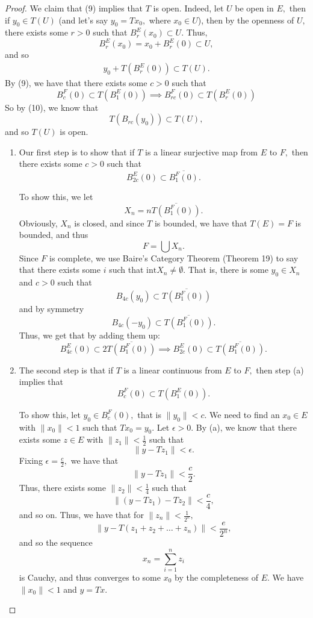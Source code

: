 \documentclass[10pt, oneside]{article}
\theoremstyle{definition}
\begin{document}
\begin{proof}
    We claim that (9) implies that $T$ is open. Indeed, let $U$ be open in $E,$ then if $y_0 \in T(U)$ (and let's say $y_0 = Tx_0,$ where $x_0 \in U$), then by the openness of $U,$ there exists some $r>0$ such that $B_r^E(x_0)\subset U.$ Thus, 
    \[B_r^E(x_0) = x_0 + B_r^E(0)\subset U,\] and so
    \begin{align}
    y_0 + T(B_r^E(0))\subset T(U).    
    \end{align}
    By (9), we have that there exists some $c>0$ such that 
    \[B_c^F(0)\subset T(B_1^E(0)) \implies B_{rc}^F(0)\subset T(B_r^E(0))\] So by (10), we know that
    \[T(B_{rc}(y_0))\subset T(U),\] and so $T(U)$ is open.

    \begin{enumerate}
        \item Our first step is to show that if $T$ is a linear surjective map from $E$ to $F,$ then there exists some $c>0$ such that 
        \[B_{2c}^E(0)\subset \overline{B^F_1(0)}.\]

        To show this, we let 
        \[X_n = n\overline{T(B^F_1(0))}.\] Obviously, $X_n$ is closed, and since $T$ is bounded, we have that $T(E) = F$ is bounded, and thus
        \[F = \bigcup X_n.\] Since $F$ is complete, we use Baire's Category Theorem (Theorem 19) to say that there exists some $i$ such that $\text{int}X_n \neq \emptyset.$ That is, there is some $y_0 \in X_n$ and $c>0$ such that 
        \[B_{4c}(y_0)\subset \overline{T(B^F_1(0))}\] and by symmetry
        \[B_{4c}(-y_0)\subset \overline{T(B_1^F(0))}.\]
        Thus, we get that by adding them up:
        \[B^E_{4c}(0) \subset 2\overline{T(B_1^F(0))} \implies B^E_{2c}(0) \subset \overline{T(B_1^F(0))}.\]

        \item The second step is that if $T$ is a linear continuous from $E$ to $F,$ then step (a) implies that 
        \[B_c^F(0)\subset T(B_1^E(0)).\]

        To show this, let $y_0 \in B_c^F(0),$ that is $\|y_0\|  < c.$ We need to find an $x_0\in E$ with $\|x_0\| < 1$ such that $Tx_0 = y_0.$ Let $\epsilon>0.$ By (a), we know that there exists some $z\in E$ with $\|z_1\|< \frac{1}{2}$ such that 
        \[\|y - Tz_1\|< \epsilon.\] Fixing $\epsilon = \frac{c}{2},$ we have that 
        \[\|y - Tz_1\|< \frac{c}{2}.\] Thus, there exists some $\|z_2\| < \frac{1}{4}$ such that 
        \[\|(y - Tz_1) - Tz_2\|< \frac{c}{4},\] and so on. Thus, we have that  for $\|z_n\|< \frac{1}{2^n},$
        \[\|y - T(z_1 + z_2 + \dots + z_n)\|< \frac{e}{2^n},\] and so the sequence 
        \[x_n = \sum_{i=1}^n z_i\] is Cauchy, and thus converges to some $x_0$ by the completeness of $E.$ We have $\|x_0\|< 1$ and $y= Tx.$
    \end{enumerate}
\end{proof}
\end{document}
